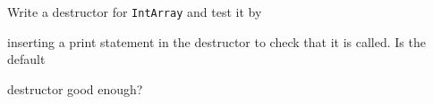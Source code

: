 Write a destructor for \texttt{IntArray} and test it by

inserting a print statement in the destructor to check that it is called. Is the default

destructor good enough?

